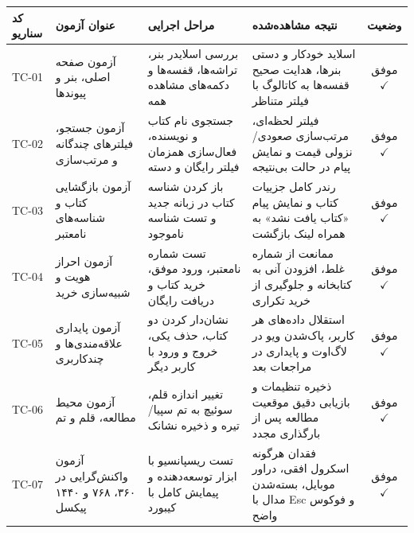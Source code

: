 \documentclass[12pt]{exam}
\begin{document}
\begin{questions}
\vspace{4pt}
\noindent
\begin{tabular*}{\textwidth}{@{\extracolsep{\fill}} p{} p{} p{} p{} c}
\toprule
\textbf{کد سناریو} & \textbf{عنوان آزمون} & \textbf{مراحل اجرایی} & \textbf{نتیجه مشاهده‌شده} & \textbf{وضعیت} \\
\midrule
TC-01 & آزمون صفحه اصلی، بنر و پیوندها & بررسی اسلایدر بنر، تراشه‌ها، قفسه‌ها و دکمه‌های مشاهده همه & اسلاید خودکار و دستی بنرها، هدایت صحیح قفسه‌ها به کاتالوگ با فیلتر متناظر & موفق $\checkmark$ \\
\addlinespace
TC-02 & آزمون جستجو، فیلترهای چندگانه و مرتب‌سازی & جستجوی نام کتاب و نویسنده، فعال‌سازی همزمان فیلتر رایگان و دسته & فیلتر لحظه‌ای، مرتب‌سازی صعودی/نزولی قیمت و نمایش پیام در حالت بی‌نتیجه & موفق $\checkmark$ \\
\addlinespace
TC-03 & آزمون بازگشایی کتاب و شناسه‌های نامعتبر & باز کردن شناسه کتاب در زبانه جدید و تست شناسه ناموجود & رندر کامل جزییات کتاب و نمایش پیام «کتاب یافت نشد» به همراه لینک بازگشت & موفق $\checkmark$ \\
\addlinespace
TC-04 & آزمون احراز هویت و شبیه‌سازی خرید & تست شماره نامعتبر، ورود موفق، خرید کتاب و دریافت رایگان & ممانعت از شماره غلط، افزودن آنی به کتابخانه و جلوگیری از خرید تکراری & موفق $\checkmark$ \\
\addlinespace
TC-05 & آزمون پایداری علاقه‌مندی‌ها و چندکاربری & نشان‌دار کردن دو کتاب، حذف یکی، خروج و ورود با کاربر دیگر & استقلال داده‌های هر کاربر، پاک‌شدن ویو در لاگ‌اوت و پایداری در مراجعات بعد & موفق $\checkmark$ \\
\addlinespace
TC-06 & آزمون محیط مطالعه، قلم و تم & تغییر اندازه قلم، سوئیچ به تم سپیا/تیره و ذخیره نشانک & ذخیره تنظیمات و بازیابی دقیق موقعیت مطالعه پس از بارگذاری مجدد & موفق $\checkmark$ \\
\addlinespace
TC-07 & آزمون واکنش‌گرایی در ۳۶۰، ۷۶۸ و ۱۴۴۰ پیکسل & تست ریسپانسیو با ابزار توسعه‌دهنده و پیمایش کامل با کیبورد & فقدان هرگونه اسکرول افقی، دراور موبایل، بسته‌شدن مدال با Esc و فوکوس واضح & موفق $\checkmark$ \\
\bottomrule
\end{tabular*}
\vspace{10pt}


\end{questions}
\end{document}

